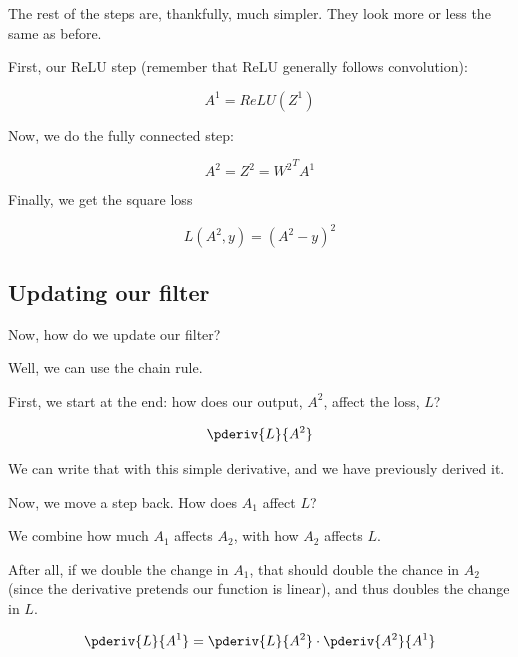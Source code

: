         The rest of the steps are, thankfully, much simpler. They look more or less the same as before.
        
        First, our ReLU step (remember that ReLU generally follows convolution):
        
        \begin{equation*}
            A^1 = ReLU(Z^1)
        \end{equation*}
        
        Now, we do the fully connected step:
        
        \begin{equation*}
            A^2 = Z^2 = {W^2}^T A^1
        \end{equation*}
        
        Finally, we get the square loss
        
        \begin{equation*}
            L(A^2, y) = (A^2-y)^2
        \end{equation*}
        
    \subsection{Updating our filter}
    
        Now, how do we update our filter?
        
        Well, we can use the chain rule.
        
        First, we start at the end: how does our output, $A^2$, affect the loss, $L$?
        
        \begin{equation*}
            \pderiv{L}{A^2}
        \end{equation*}
        
        We can write that with this simple derivative, and we have previously derived it.
        
        Now, we move a step back. How does $A_1$ affect $L$?
        
        We combine how much $A_1$ affects $A_2$, with how $A_2$ affects $L$.
        
        After all, if we double the change in $A_1$, that should double the chance in $A_2$ (since the derivative pretends our function is linear), and thus doubles the change in $L$.
        
        \begin{equation*}
            \pderiv{L}{A^1} = \pderiv{L}{A^2} \cdot \pderiv{A^2}{A^1} 
        \end{equation*}
        
